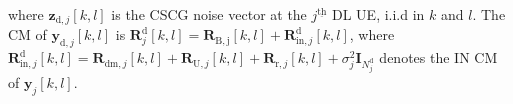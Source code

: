 \documentclass[9pt,journal]{IEEEtran}
\newcommand{\bracket}[1]{{\left [{#1}\right ]}}
\newcommand{\ith}[1]    {{#1}^{\underline{\text{th}}}}
\theoremstyle{definition}
\begin{document}
where $\mathbf{z}_{\textrm{d},j}\bracket{k,l}$ is the CSCG noise vector at the $\ith{j}$ DL UE, i.i.d in $k$ and $l$. The CM of $\mathbf{y}_{\textrm{d},j}\bracket{k,l}$ is $\mathbf{R}^\mathrm{d}_j\bracket{k,l}=\mathbf{R}_{\mathrm{B,j}}\bracket{k,l}+\mathbf{R}^\mathrm{d}_{\mathrm{in,}j}\bracket{k,l}$, where $	\mathbf{R}^\textrm{d}_{\mathrm{in},j}\bracket{k,l}=\mathbf{R}_{\mathrm{dm},j}\bracket{k,l}+\mathbf{R}_{\mathrm{U,}j}\bracket{k,l}+\mathbf{R}_{\mathrm{r},j}\bracket{k,l}+\sigma^2_j\mathbf{I}_{\mathit{N}^{\textrm{d}}_j}$ denotes the IN CM of $\mathbf{y}_{j}\bracket{k,l}$.   %
	
\end{document}
